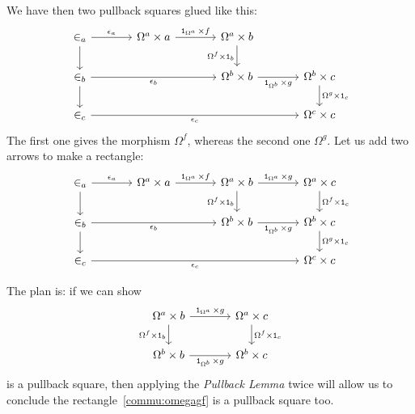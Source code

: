 We have then two pullback squares glued like this:
\[\begin{tikzcd}[column sep=large]
\in_a \ar["{\epsilon_a}", r] \ar[d] & \Omega^a \times a \ar["{\id_{\Omega^a} \times f}", r] & \Omega^a \times b \ar["{\Omega^f \times \id_b}", d, swap] \\
\in_b \ar[d] \ar["{\epsilon_b}", rr, swap] & & \Omega^b \times b \ar["{\id_{\Omega^b} \times g}", r, swap] & \Omega^b \times c \ar["{\Omega^g \times \id_c}", d] \\
\in_c \ar["{\epsilon_c}", rrr, swap] & & & \Omega^c \times c
\end{tikzcd}\]
The first one gives the morphism \(\Omega^f\), whereas the second one \(\Omega^g\). Let us add two arrows to make a rectangle:
\[\begin{tikzcd}[column sep=large]
\in_a \ar["{\epsilon_a}", r] \ar[d] & \Omega^a \times a \ar["{\id_{\Omega^a} \times f}", r] & \Omega^a \times b \ar["{\Omega^f \times \id_b}", d, swap] \ar["{\id_{\Omega^a} \times g}", r] & \Omega^a \times c \ar["{\Omega^f \times \id_c}", d] \\
\in_b \ar[d] \ar["{\epsilon_b}", rr, swap] & & \Omega^b \times b \ar["{\id_{\Omega^b} \times g}", r, swap] & \Omega^b \times c \ar["{\Omega^g \times \id_c}", d] \\
\in_c \ar["{\epsilon_c}", rrr, swap] & & & \Omega^c \times c
\end{tikzcd}\]

The plan is: if we can show
\[\begin{tikzcd}[column sep=large]
\Omega^a \times b \ar["{\Omega^f \times \id_b}", d, swap] \ar["{\id_{\Omega^a} \times g}", r] & \Omega^a \times c \ar["{\Omega^f \times \id_c}", d] \\
\Omega^b \times b \ar["{\id_{\Omega^b} \times g}", r, swap] & \Omega^b \times c
\end{tikzcd}\]
is a pullback square, then applying the {\em Pullback Lemma} twice will allow us to conclude the rectangle~\eqref{commu:omegagf} is a pullback square too.

